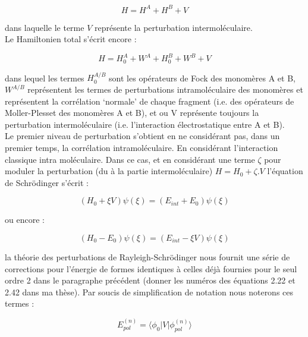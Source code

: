 \begin{equation}
H = H^{A} + H^{B} + V
\end{equation}
   
dans laquelle le terme $V$ représente la perturbation intermoléculaire.\\
   
Le Hamiltonien total s'écrit encore :
   
\begin{equation}
H = H_{0}^{A} + W^{A} + H_{0}^{B} + W^{B} + V
\end{equation}
   
dans lequel les termes $H_{0}^{A/B}$ sont les opérateurs de Fock des monomères A et B, $W^{A/B}$ représentent les termes de perturbations intramoléculaire des monomères et représentent la corrélation ‘normale’ de chaque fragment (i.e. des opérateurs de Moller-Plesset des monomères A et B), et ou V représente toujours la perturbation intermoléculaire (i.e. l’interaction électrostatique entre A et B).\\
   
Le premier niveau de perturbation s’obtient en ne considérant pas, dans un premier temps, la corrélation intramoléculaire. En considérant l’interaction classique intra moléculaire. Dans ce cas, et en considérant une terme $\zeta$ pour moduler la perturbation (du à la partie intermoléculaire) $H = H_0 + \zeta.V$ l’équation de Schr\"{o}dinger s’écrit :
   
\begin{equation}
(H_{0} + \xi V) \psi (\xi) = (E_{int} + E_{0}) \psi (\xi)
\end{equation}
   
ou encore :
   
\begin{equation}
(H_{0} - E_{0}) \psi (\xi) = (E_{int} - \xi V) \psi (\xi)
\end{equation}
   
la théorie des perturbations de Rayleigh-Schr\"{o}dinger nous fournit une série de corrections pour l’énergie \cite{chipman1973perturbation}
de formes identiques à celles déjà fournies pour le seul ordre 2 dans le paragraphe précédent (donner les numéros des équations 2.22 et 2.42 dans ma thèse). Par soucis de simplification de notation nous noterons ces termes :
   
\begin{equation}
E_{pol}^{(n)} = \langle \phi_{0}|V| \phi_{pol}^{(n)} \rangle
\end{equation}
   

